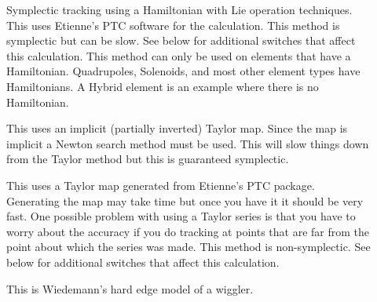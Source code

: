 \begin{description}
\item[]
Symplectic tracking using a Hamiltonian with Lie operation techniques.
This uses Etienne's PTC software for the calculation. This method is
symplectic but can be slow. See below for additional switches that affect this
calculation. This method can only be used on elements that have a Hamiltonian.
Quadrupoles, Solenoids, and most other element types have Hamiltonians. A
Hybrid element is an  example where there is no Hamiltonian.

\item[]
This uses an implicit (partially inverted) Taylor map.
Since the map is implicit a Newton search method must be used. This will slow
things down from the Taylor method but this is guaranteed symplectic.

\item[]
This uses a Taylor map generated from Etienne's PTC package. Generating
the map may take time but once you have it it should be very fast. One
possible problem with using a Taylor series is that you have to worry about
the accuracy if you do tracking at points that are far from the point about
which the series was made. This method is non-symplectic. See below for
additional switches that affect this calculation.

\item[]
This is Wiedemann's hard edge model of a wiggler.

\end{description}
